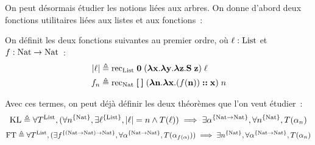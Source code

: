 \documentclass{article}
\begin{document}
On peut désormais étudier les notions liées aux arbres. On donne d'abord deux fonctions utilitaires liées aux listes et aux fonctions~:

\begin{defi}
  On définit les deux fonctions suivantes au premier ordre, où $\ell : \mathrm{List}$ et $f : \mathrm{Nat}\to\mathrm{Nat}$~:
  \begin{align*}
    |\ell| &\triangleq \mathrm{rec}_{\mathrm{List}}\;\boldsymbol 0\;(\boldsymbol{\lambda} \mathbf{x}.\boldsymbol{\lambda}\mathbf{y}.\boldsymbol{\lambda}\mathbf{z}.\mathbf{S}\;\mathbf{z})\;\ell\\
    f_n &\triangleq \mathrm{rec}_{\mathrm{Nat}}\;\boldsymbol{ [ }\:\boldsymbol{ ] }\;(\boldsymbol{\lambda} \mathbf{n}.\boldsymbol{\lambda} \mathbf{x}.(f(\mathbf{n}))\boldsymbol{:}\boldsymbol{:} \mathbf{x})\;n
  \end{align*}
\end{defi}

Avec ces termes, on peut déjà définir les deux théorèmes que l'on veut étudier~:
\begin{equation}
  \mathrm{KL} \triangleq \forall T^{\mathrm{List}}, (\forall n^{\{\mathrm{Nat}\}}, \exists \ell^{\{\mathrm{List}\}}, |\ell| = n \land T(\ell)) \implies \exists \alpha^{\{\mathrm{Nat}\to\mathrm{Nat}\}}, \forall n^{\{\mathrm{Nat}\}}, T(\alpha_n)
\end{equation}
\begin{equation}
  \mathrm{FT} \triangleq \forall T^{\mathrm{List}}, (\exists f^{\{(\mathrm{Nat}\to\mathrm{Nat})\to\mathrm{Nat}\}}, \forall \alpha^{\{\mathrm{Nat} \to \mathrm{Nat}\}}, T(\alpha_{f(\alpha)})) \implies \exists n^{\{\mathrm{Nat}\}}, \forall \alpha^{\{\mathrm{Nat} \to \mathrm{Nat}\}}, T(\alpha_n)
\end{equation}
\end{document}
